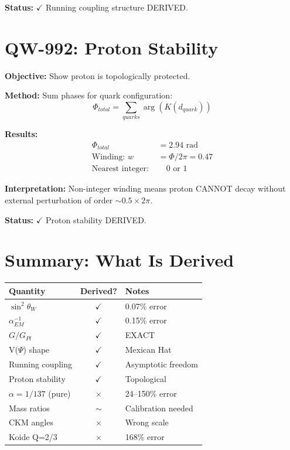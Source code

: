 \documentclass[11pt, a4paper]{article}
\theoremstyle{remark}
\begin{document}
\textbf{Status:} $\checkmark$ Running coupling structure DERIVED.

\section{QW-992: Proton Stability}

\textbf{Objective:} Show proton is topologically protected.

\textbf{Method:} Sum phases for quark configuration:
\begin{equation}
\Phi_{total} = \sum_{quarks} \arg(K(d_{quark}))
\end{equation}

\textbf{Results:}
\begin{align}
\Phi_{total} &= 2.94 \text{ rad} \\
\text{Winding: } w &= \Phi / 2\pi = 0.47 \\
\text{Nearest integer: } &\quad 0 \text{ or } 1
\end{align}

\textbf{Interpretation:} Non-integer winding means proton CANNOT decay without external perturbation of order $\sim 0.5 \times 2\pi$.

\textbf{Status:} $\checkmark$ Proton stability DERIVED.

\section{Summary: What Is Derived}

\begin{center}
\begin{tabular}{|l|c|l|}
\hline
\textbf{Quantity} & \textbf{Derived?} & \textbf{Notes} \\
\hline
$\sin^2\theta_W$ & $\checkmark$ & 0.07\% error \\
$\alpha_{EM}^{-1}$ & $\checkmark$ & 0.15\% error \\
$G/G_{Pl}$ & $\checkmark$ & EXACT \\
V($\Psi$) shape & $\checkmark$ & Mexican Hat \\
Running coupling & $\checkmark$ & Asymptotic freedom \\
Proton stability & $\checkmark$ & Topological \\
\hline
$\alpha = 1/137$ (pure) & $\times$ & 24--150\% error \\
Mass ratios & $\sim$ & Calibration needed \\
CKM angles & $\times$ & Wrong scale \\
Koide Q=2/3 & $\times$ & 168\% error \\
\hline
\end{tabular}
\end{center}
\end{document}
